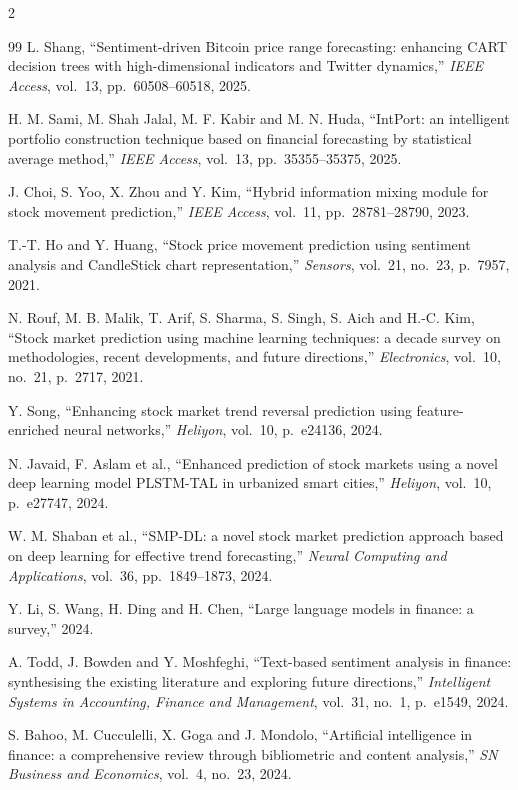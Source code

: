 \begin{footnotesize}
\begin{multicols}{2}
\begin{thebibliography}{99}
 L. Shang, ``Sentiment-driven Bitcoin price range forecasting:
enhancing CART decision trees with high-dimensional indicators and Twitter dynamics,''
\emph{IEEE Access}, vol.~13, pp.~60508--60518, 2025.

 H. M. Sami, M. Shah Jalal, M. F. Kabir and M. N. Huda, ``IntPort: an
intelligent portfolio construction technique based on financial forecasting by statistical
average method,'' \emph{IEEE Access}, vol.~13, pp.~35355--35375, 2025.

 J. Choi, S. Yoo, X. Zhou and Y. Kim, ``Hybrid information mixing module
for stock movement prediction,'' \emph{IEEE Access}, vol.~11, pp.~28781--28790, 2023.

 T.-T. Ho and Y. Huang, ``Stock price movement prediction using sentiment
analysis and CandleStick chart representation,'' \emph{Sensors}, vol.~21, no.~23, p.~7957,
2021.

 N. Rouf, M. B. Malik, T. Arif, S. Sharma, S. Singh, S. Aich and
H.-C. Kim, ``Stock market prediction using machine learning techniques: a decade survey on
methodologies, recent developments, and future directions,'' \emph{Electronics}, vol.~10,
no.~21, p.~2717, 2021.

 Y. Song, ``Enhancing stock market trend reversal prediction using
feature-enriched neural networks,'' \emph{Heliyon}, vol.~10, p.~e24136, 2024.

 N. Javaid, F. Aslam et al., ``Enhanced prediction of stock markets
using a novel deep learning model PLSTM-TAL in urbanized smart cities,'' \emph{Heliyon},
vol.~10, p.~e27747, 2024.

 W. M. Shaban et al., ``SMP-DL: a novel stock market prediction
approach based on deep learning for effective trend forecasting,'' \emph{Neural Computing
and Applications}, vol.~36, pp.~1849--1873, 2024.

 Y. Li, S. Wang, H. Ding and H. Chen, ``Large language models in
finance: a survey,'' 2024.

 A. Todd, J. Bowden and Y. Moshfeghi, ``Text-based sentiment analysis in
finance: synthesising the existing literature and exploring future directions,''
\emph{Intelligent Systems in Accounting, Finance and Management}, vol.~31, no.~1,
p.~e1549, 2024.

 S. Bahoo, M. Cucculelli, X. Goga and J. Mondolo, ``Artificial
intelligence in finance: a comprehensive review through bibliometric and content
analysis,'' \emph{SN Business and Economics}, vol.~4, no.~23, 2024.


\end{thebibliography}
\end{multicols}
\end{footnotesize}
